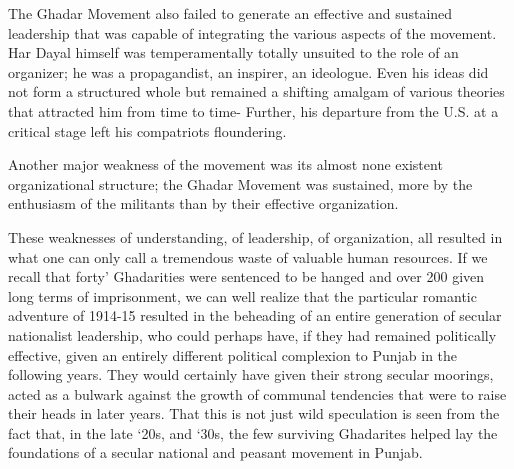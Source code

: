The Ghadar Movement also failed to generate an effective and sustained leadership that was capable of integrating the various aspects of the movement. Har Dayal himself was temperamentally totally unsuited to the role of an organizer; he was a propagandist, an inspirer, an ideologue. Even his ideas did not form a structured whole but remained a shifting amalgam of various theories that attracted him from time to time- Further, his departure from the U.S. at a critical stage left his compatriots floundering.

Another major weakness of the movement was its almost none existent organizational structure; the Ghadar Movement was sustained, more by the enthusiasm of the militants than by their effective organization.

These weaknesses of understanding, of leadership, of organization, all resulted in what one can only call a tremendous waste of valuable human resources. If we recall that forty' Ghadarities were sentenced to be hanged and over 200 given long terms of imprisonment, we can well realize that the particular romantic adventure of 1914-15 resulted in the beheading of an entire generation of secular nationalist leadership, who could perhaps have, if they had remained politically effective, given an entirely different political complexion to Punjab in the following years. They would certainly have given their strong secular moorings, acted as a bulwark against the growth of communal tendencies that were to raise their heads in later years. That this is not just wild speculation is seen from the fact that, in the late `20s, and `30s, the few surviving Ghadarites helped lay the foundations of a secular national and peasant movement in Punjab.
